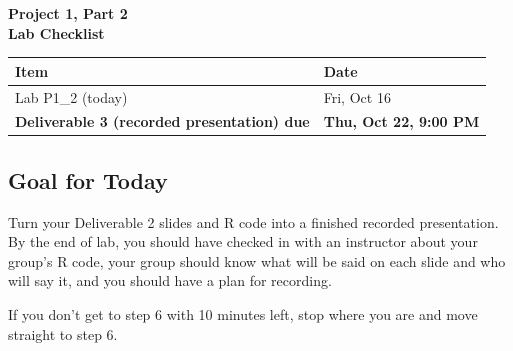 \documentclass[12pt]{article}
\begin{document}
\begin{center}
\textbf{\Large Project 1, Part 2 \\ Lab Checklist}
\end{center}

\nameBUID

\begin{center}
\begin{tabular}{ll}
\toprule
\textbf{Item} & \textbf{Date} \\
\midrule
Lab P1\_2 (today) & Fri, Oct 16 \\
\textbf{Deliverable 3 (recorded presentation) due} & \textbf{Thu, Oct 22, 9:00 PM} \\
\bottomrule
\end{tabular}
\end{center}

\subsection*{Goal for Today}
Turn your Deliverable 2 slides and R code into a finished recorded presentation. By the end of lab, you should have checked in with an instructor about your group's R code, your group should know what will be said on each slide and who will say it, and you should have a plan for recording.

\vspace{6pt}
\noindent If you don't get to step 6 with 10 minutes left, stop where you are and move straight to step 6.
\end{document}
